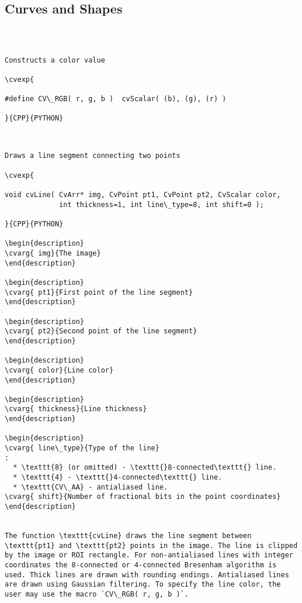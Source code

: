 \subsection{Curves and Shapes}
\begin{verbatim}


\end{verbatim}
\begin{verbatim}

Constructs a color value

\cvexp{

#define CV\_RGB( r, g, b )  cvScalar( (b), (g), (r) )

}{CPP}{PYTHON}


\end{verbatim}
\begin{verbatim}

Draws a line segment connecting two points

\cvexp{

void cvLine( CvArr* img, CvPoint pt1, CvPoint pt2, CvScalar color,
             int thickness=1, int line\_type=8, int shift=0 );

}{CPP}{PYTHON}

\begin{description}
\cvarg{ img}{The image}
\end{description}

\begin{description}
\cvarg{ pt1}{First point of the line segment}
\end{description}

\begin{description}
\cvarg{ pt2}{Second point of the line segment}
\end{description}

\begin{description}
\cvarg{ color}{Line color}
\end{description}

\begin{description}
\cvarg{ thickness}{Line thickness}
\end{description}

\begin{description}
\cvarg{ line\_type}{Type of the line}
:
  * \texttt{8} (or omitted) - \texttt{}8-connected\texttt{} line.
  * \texttt{4} - \texttt{}4-connected\texttt{} line.
  * \texttt{CV\_AA} - antialiased line.
\cvarg{ shift}{Number of fractional bits in the point coordinates}
\end{description}


The function \texttt{cvLine} draws the line segment between \texttt{pt1} and \texttt{pt2} points in the image. The line is clipped by the image or ROI rectangle. For non-antialiased lines with integer coordinates the 8-connected or 4-connected Bresenham algorithm is used. Thick lines are drawn with rounding endings. Antialiased lines are drawn using Gaussian filtering. To specify the line color, the user may use the macro `CV\_RGB( r, g, b )`.


\end{verbatim}
